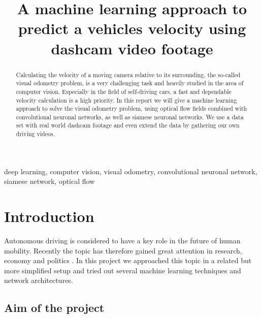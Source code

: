 \documentclass[conference]{IEEEtran}
\begin{document}
\title{A machine learning approach to predict a vehicles velocity using dashcam video footage}

\author{
\and
{}
}

\maketitle

\begin{abstract}
Calculating the velocity of a moving camera relative to its surrounding, the so-called visual odometry 
problem, is a very challenging task and heavily studied in the area of computer vision. Especially
in the field of self-driving cars, a fast and dependable velocity calculation is a high priority.
In this report we will give a machine learning approach to solve the visual odometry problem, using 
optical flow fields combined with convolutional neuronal networks, as well as siamese neuronal networks.
We use a data set with real world dashcam footage and even extend the data by gathering our own
driving videos.
\end{abstract}

\begin{IEEEkeywords}
deep learning, computer vision, visual odometry, convolutional neuronal network, siamese network,
optical flow
\end{IEEEkeywords}

\section{Introduction}

Autonomous driving is considered to have a key role in the future of human mobility. Recently the topic has therefore gained great attention in research, economy and politics \cite{Maurer2016}. In this project we approached this topic in a related but more simplified setup and tried out several machine learning techniques and network architectures.

\subsection{Aim of the project}
\label{subsec:AimAndMeasure}
\end{document}
